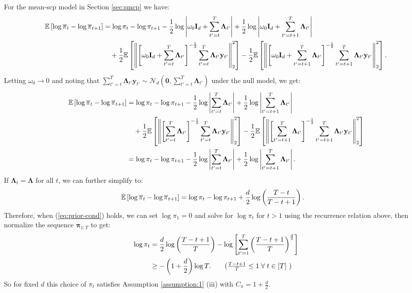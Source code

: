 For the mean-scp model in Section \ref{sec:smcp} we have:
\small
\begin{align*}
    \mathbb{E}\left[\log\overline{\pi}_t - \log \overline{\pi}_{t+1} \right] &= \log \pi_t - \log \pi_{t+1} - \frac{1}{2} \log \left|\omega_0\mathbf{I}_d + \sum_{t'=t}^{T} \boldsymbol{\Lambda}_{t'}\right| + \frac{1}{2} \log \left|\omega_0\mathbf{I}_d + \sum_{t'=t+1}^{T} \boldsymbol{\Lambda}_{t'}\right|\\
    &\quad + \frac{1}{2} \mathbb{E}\left[\left\lVert \left[\omega_0\mathbf{I}_d + \sum_{t'=t}^{T} \boldsymbol{\Lambda}_{t'}\right]^{-\frac{1}{2}} \sum_{t'=t}^{T} \boldsymbol{\Lambda}_{t'} \mathbf{y}_{t'}\right\rVert_2^2 \right] - \frac{1}{2} \mathbb{E}\left[\left\lVert \left[\omega_0\mathbf{I}_d + \sum_{t'=t+1}^{T} \boldsymbol{\Lambda}_{t'}\right]^{-\frac{1}{2}} \sum_{t'=t+1}^{T} \boldsymbol{\Lambda}_{t'} \mathbf{y}_{t'}\right\rVert_2^2 \right].
\end{align*}
\normalsize
Letting $\omega_0 \to 0$ and noting that $\sum_{t'=t}^{T} \boldsymbol{\Lambda}_{t'} \mathbf{y}_{t'} \sim \mathcal{N}_d\left(\mathbf{0}, \sum_{t'=t}^{T} \boldsymbol{\Lambda}_{t'}\right)$ under the null model, we get:
\small
\begin{align*}
    \mathbb{E}\left[\log\overline{\pi}_t - \log \overline{\pi}_{t+1} \right] &= \log \pi_t - \log \pi_{t+1} - \frac{1}{2} \log \left|\sum_{t'=t}^{T} \boldsymbol{\Lambda}_{t'}\right| + \frac{1}{2} \log \left|\sum_{t'=t+1}^{T} \boldsymbol{\Lambda}_{t'}\right|\\
    &\quad + \frac{1}{2} \mathbb{E}\left[\left\lVert \left[ \sum_{t'=t}^{T} \boldsymbol{\Lambda}_{t'}\right]^{-\frac{1}{2}} \sum_{t'=t}^{T} \boldsymbol{\Lambda}_{t'} \mathbf{y}_{t'}\right\rVert_2^2  \right] - \frac{1}{2} \mathbb{E}\left[\left\lVert \left[\sum_{t'=t+1}^{T} \boldsymbol{\Lambda}_{t'}\right]^{-\frac{1}{2}} \sum_{t'=t+1}^{T} \boldsymbol{\Lambda}_{t'} \mathbf{y}_{t'}\right\rVert_2^2  \right]\\
    &= \log \pi_t - \log \pi_{t+1} - \frac{1}{2} \log \left|\sum_{t'=t}^{T} \boldsymbol{\Lambda}_{t'}\right| + \frac{1}{2} \log \left|\sum_{t'=t+1}^{T} \boldsymbol{\Lambda}_{t'}\right|.
\end{align*}
\normalsize
If $\boldsymbol{\Lambda}_t = \boldsymbol{\Lambda}$ for all $t$, we can further simplify to:
\begin{align*}
    \mathbb{E}\left[\log\overline{\pi}_t - \log \overline{\pi}_{t+1} \right] &= \log \pi_t - \log \pi_{t+1} + \frac{d}{2} \log\left(\frac{T-t}{T-t+1}\right).
\end{align*}
Therefore, when (\ref{eq:prior-cond}) holds, we can set $\log \pi_1 = 0$ and solve for $\log \pi_t$ for $t > 1$ using the recurrence relation above, then normalize the sequence $\boldsymbol{\pi}_{1:T}$ to get:
\begin{align*}
    \log \pi_t &= \frac{d}{2}\log\left(\frac{T-t+1}{T}\right) - \log\left[\sum_{t'=1}^T \left(\frac{T-t+1}{T}\right)^{\frac{d}{2}}\right] \\
    &\geq - \left(1 + \frac{d}{2}\right)\log T. \tag{$\frac{T-t+1}{T} \leq 1 \sforall t \in [T]$ }
\end{align*}
So for fixed $d$ this choice of $\pi_t$ satisfies Assumption \ref{assumption:1} (iii) with $C_\pi = 1 + \frac{d}{2}$.

